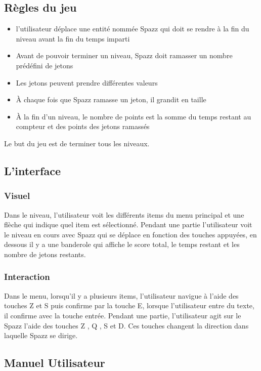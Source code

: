 \documentclass[a4paper,11pt]{scrartcl}
\begin{document}
\subsection{Règles du jeu}
\begin{itemize}[label = $\bullet$]
	\item l'utilisateur déplace une entité nommée Spazz qui doit se rendre à la fin du niveau avant la fin du temps imparti
	\item Avant de pouvoir terminer un niveau, Spazz doit ramasser un nombre prédéfini de jetons
	\item Les jetons peuvent prendre différentes valeurs
	\item À chaque fois que Spazz ramasse un jeton, il grandit en taille
	\item À la fin d'un niveau, le nombre de points est la somme du temps restant au compteur et des points des jetons ramassés
\end{itemize}

Le but du jeu est de terminer tous les niveaux.

\subsection{L'interface}

\subsubsection{Visuel}
Dans le niveau, l'utilisateur voit les différents items du menu principal et une flèche qui indique quel item est sélectionné.
Pendant une partie l'utilisateur voit le niveau en cours avec Spazz qui se déplace en fonction des touches appuyées, en dessous il y a une banderole qui affiche le score total, le temps restant et les nombre de jetons restants.

\subsubsection{Interaction}
Dans le menu, lorsqu'il y a plusieurs items, l'utilisateur navigue à l'aide des touches Z et S puis confirme par la touche E, lorsque l'utilisateur entre du texte, il confirme avec la touche entrée.
Pendant une partie, l'utilisateur agit sur le Spazz l'aide des touches Z , Q , S et D. Ces touches changent la direction dans laquelle Spazz se dirige.


\subsection{Manuel Utilisateur}
\end{document}
